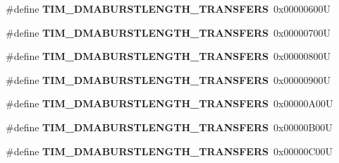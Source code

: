 \begin{DoxyCompactItemize}
\item 
\mbox{\label{group___t_i_m___d_m_a___burst___length_gae75055ac13b73baf9326f1d6157853a7}} 
\#define {\bfseries T\+I\+M\+\_\+\+D\+M\+A\+B\+U\+R\+S\+T\+L\+E\+N\+G\+T\+H\+\_\+T\+R\+A\+N\+S\+F\+E\+RS}~0x00000600U
\item 
\mbox{\label{group___t_i_m___d_m_a___burst___length_gac6b24f5b7d9e1968b4bfcaeb24e718fc}} 
\#define {\bfseries T\+I\+M\+\_\+\+D\+M\+A\+B\+U\+R\+S\+T\+L\+E\+N\+G\+T\+H\+\_\+T\+R\+A\+N\+S\+F\+E\+RS}~0x00000700U
\item 
\mbox{\label{group___t_i_m___d_m_a___burst___length_ga73fff75a3f0247c61a84a42e8cb83572}} 
\#define {\bfseries T\+I\+M\+\_\+\+D\+M\+A\+B\+U\+R\+S\+T\+L\+E\+N\+G\+T\+H\+\_\+T\+R\+A\+N\+S\+F\+E\+RS}~0x00000800U
\item 
\mbox{\label{group___t_i_m___d_m_a___burst___length_ga793a89bb8a0669e274de451985186c53}} 
\#define {\bfseries T\+I\+M\+\_\+\+D\+M\+A\+B\+U\+R\+S\+T\+L\+E\+N\+G\+T\+H\+\_\+T\+R\+A\+N\+S\+F\+E\+RS}~0x00000900U
\item 
\mbox{\label{group___t_i_m___d_m_a___burst___length_ga79ab58b6a3b30c54c0758b381df22cb0}} 
\#define {\bfseries T\+I\+M\+\_\+\+D\+M\+A\+B\+U\+R\+S\+T\+L\+E\+N\+G\+T\+H\+\_\+T\+R\+A\+N\+S\+F\+E\+RS}~0x00000\+A00U
\item 
\mbox{\label{group___t_i_m___d_m_a___burst___length_gaf52962b501b3a76d89df6274ed425947}} 
\#define {\bfseries T\+I\+M\+\_\+\+D\+M\+A\+B\+U\+R\+S\+T\+L\+E\+N\+G\+T\+H\+\_\+T\+R\+A\+N\+S\+F\+E\+RS}~0x00000\+B00U
\item 
\mbox{\label{group___t_i_m___d_m_a___burst___length_ga06a81eba628bea6495d86ebcc6021da0}} 
\#define {\bfseries T\+I\+M\+\_\+\+D\+M\+A\+B\+U\+R\+S\+T\+L\+E\+N\+G\+T\+H\+\_\+T\+R\+A\+N\+S\+F\+E\+RS}~0x00000\+C00U
\item 
\mbox{\label{group___t_i_m___d_m_a___burst___length_ga5f430b76c0aeded0a8d8be779f26ae52}} 

\end{DoxyCompactItemize}
